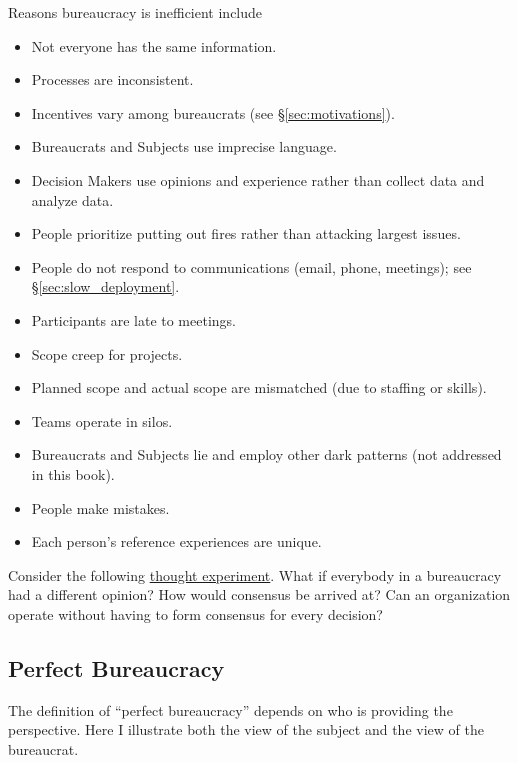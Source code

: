 Reasons bureaucracy is inefficient include
\begin{itemize}
    \item Not everyone has the same information.
    \item Processes are inconsistent.
    \item Incentives vary among bureaucrats (see \S\ref{sec:motivations}).
    \item Bureaucrats and Subjects use imprecise language.
    \item Decision Makers use opinions and experience rather than collect data and analyze data.
    \item People prioritize putting out fires rather than attacking largest issues.
    \item People do not respond to communications (email, phone, meetings); see \S\ref{sec:slow_deployment}.
    \item Participants are late to meetings.
    \item Scope creep for projects.
    \item Planned scope and actual scope are mismatched  (due to staffing or skills).
    \item Teams operate in silos.
    \item Bureaucrats and Subjects lie and employ other dark patterns (not addressed in this book).
    \item People make mistakes.
    \item Each person's reference experiences are unique.
\end{itemize}
Consider the following \href{https://en.wikipedia.org/wiki/Thought_experiment}{thought experiment}. 
What if everybody in a bureaucracy had a different opinion? How would consensus be arrived at? Can an organization operate without having to form consensus for every decision? 



\subsection{Perfect Bureaucracy}

The definition of ``perfect bureaucracy'' depends on who is providing the perspective. Here I illustrate both the view of the subject and the view of the bureaucrat. 

